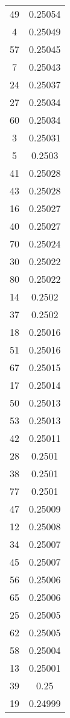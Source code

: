 \documentclass{article}
\begin{document}
            \vspace{10cm}

            \twocolumn
            \centering
            \begin{supertabular}{cc}
            \toprule
            \midrule
            
49 & 0.25054 \\
4 & 0.25049 \\
57 & 0.25045 \\
7 & 0.25043 \\
24 & 0.25037 \\
27 & 0.25034 \\
60 & 0.25034 \\
3 & 0.25031 \\
5 & 0.2503 \\
41 & 0.25028 \\
43 & 0.25028 \\
16 & 0.25027 \\
40 & 0.25027 \\
70 & 0.25024 \\
30 & 0.25022 \\
80 & 0.25022 \\
14 & 0.2502 \\
37 & 0.2502 \\
18 & 0.25016 \\
51 & 0.25016 \\
67 & 0.25015 \\
17 & 0.25014 \\
50 & 0.25013 \\
53 & 0.25013 \\
42 & 0.25011 \\
28 & 0.2501 \\
38 & 0.2501 \\
77 & 0.2501 \\
47 & 0.25009 \\
12 & 0.25008 \\
34 & 0.25007 \\
45 & 0.25007 \\
56 & 0.25006 \\
65 & 0.25006 \\
25 & 0.25005 \\
62 & 0.25005 \\
58 & 0.25004 \\
13 & 0.25001 \\
39 & 0.25 \\
19 & 0.24999 \\

\end{supertabular}
\end{document}

